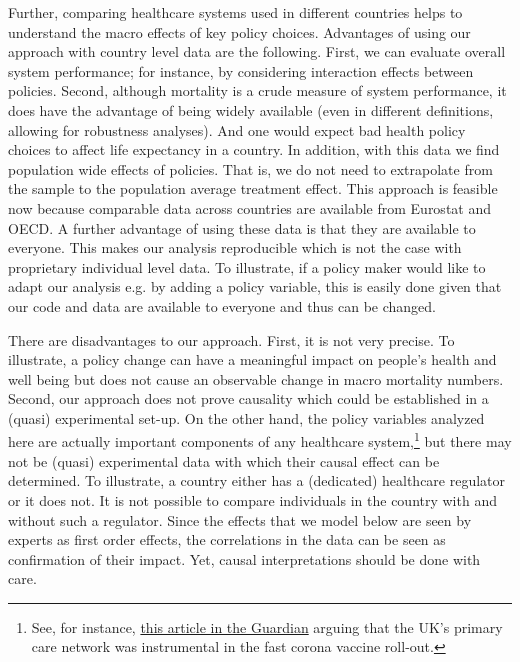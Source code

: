 \documentclass[a4paper,12pt]{article}
\begin{document}
Further, comparing healthcare systems used in different countries helps to understand the macro effects of key policy choices. Advantages of using our approach with country level data are the following. First, we can evaluate overall system performance; for instance, by considering interaction effects between policies. Second, although mortality is a crude measure of system performance, it does have the advantage of being widely available (even in different definitions, allowing for robustness analyses). And one would expect bad health policy choices to affect life expectancy in a country. In addition, with this data we find population wide effects of policies. That is, we do not need to extrapolate from the sample to the population average treatment effect. This approach is feasible now because comparable data across countries are available from Eurostat and OECD. A further advantage of using these data is that they are available to everyone. This makes our analysis reproducible which is not the case with proprietary individual level data. To illustrate, if a policy maker would like to adapt our analysis e.g. by adding a policy variable, this is easily done given that our code and data are available to everyone and thus can be changed.

There are disadvantages to our approach. First, it is not very precise. To illustrate, a policy change can have a meaningful impact on people's health and well being but does not cause an observable change in macro mortality numbers. Second, our approach does not prove causality which could be established in a (quasi) experimental set-up. On the other hand, the policy variables analyzed here are actually important components of any healthcare system,\footnote{See, for instance, \href{https://www.theguardian.com/society/2021/feb/12/coronavirus-shows-what-we-are-capable-of-nhs-vaccine-triumph}{this article in the Guardian} arguing that the UK's primary care network was instrumental in the fast corona vaccine roll-out.} but there may not be (quasi) experimental data with which their causal effect can be determined. To illustrate, a country either has a (dedicated) healthcare regulator or it does not. It is not possible to compare individuals in the country with and without such a regulator. Since the effects that we model below are seen by experts as first order effects, the correlations in the data can be seen as confirmation of their impact. Yet, causal interpretations should be done with care.
\end{document}

